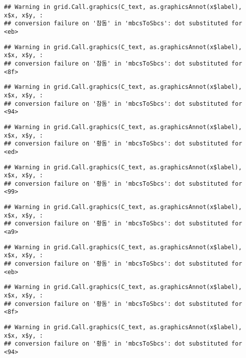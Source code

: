 \documentclass[
]{article}
\begin{document}
\begin{verbatim}
## Warning in grid.Call.graphics(C_text, as.graphicsAnnot(x$label), x$x, x$y, :
## conversion failure on '참돔' in 'mbcsToSbcs': dot substituted for <eb>
\end{verbatim}

\begin{verbatim}
## Warning in grid.Call.graphics(C_text, as.graphicsAnnot(x$label), x$x, x$y, :
## conversion failure on '참돔' in 'mbcsToSbcs': dot substituted for <8f>
\end{verbatim}

\begin{verbatim}
## Warning in grid.Call.graphics(C_text, as.graphicsAnnot(x$label), x$x, x$y, :
## conversion failure on '참돔' in 'mbcsToSbcs': dot substituted for <94>
\end{verbatim}

\begin{verbatim}
## Warning in grid.Call.graphics(C_text, as.graphicsAnnot(x$label), x$x, x$y, :
## conversion failure on '황돔' in 'mbcsToSbcs': dot substituted for <ed>
\end{verbatim}

\begin{verbatim}
## Warning in grid.Call.graphics(C_text, as.graphicsAnnot(x$label), x$x, x$y, :
## conversion failure on '황돔' in 'mbcsToSbcs': dot substituted for <99>
\end{verbatim}

\begin{verbatim}
## Warning in grid.Call.graphics(C_text, as.graphicsAnnot(x$label), x$x, x$y, :
## conversion failure on '황돔' in 'mbcsToSbcs': dot substituted for <a9>
\end{verbatim}

\begin{verbatim}
## Warning in grid.Call.graphics(C_text, as.graphicsAnnot(x$label), x$x, x$y, :
## conversion failure on '황돔' in 'mbcsToSbcs': dot substituted for <eb>
\end{verbatim}

\begin{verbatim}
## Warning in grid.Call.graphics(C_text, as.graphicsAnnot(x$label), x$x, x$y, :
## conversion failure on '황돔' in 'mbcsToSbcs': dot substituted for <8f>
\end{verbatim}

\begin{verbatim}
## Warning in grid.Call.graphics(C_text, as.graphicsAnnot(x$label), x$x, x$y, :
## conversion failure on '황돔' in 'mbcsToSbcs': dot substituted for <94>
\end{verbatim}
\end{document}
